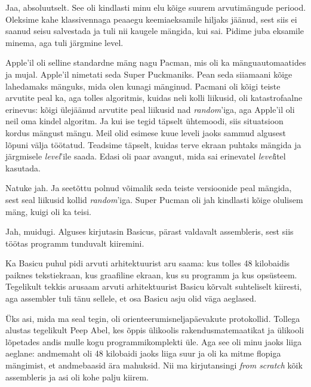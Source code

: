 
Jaa, absoluutselt. See oli kindlasti minu 
elu kõige suurem arvutimängude periood. Oleksime kahe klassivennaga peaaegu 
keemiaeksamile hiljaks jäänud, sest siis ei saanud seisu salvestada ja tuli nii kaugele mängida, kui sai. Pidime juba eksamile minema, aga tuli järgmine 
level.


Apple'il oli selline standardne mäng nagu Pacman, mis oli ka mänguautomaatides ja mujal. Apple'il nimetati seda Super Puckmaniks. Pean seda siiamaani kõige lahedamaks mänguks, mida olen kunagi 
mänginud. Pacmani oli kõigi teiste arvutite peal ka, aga tolles algoritmis, kuidas 
neli kolli liikusid, oli katastrofaalne erinevus: kõigi ülejäänud arvutite peal liikusid nad \emph{random}'iga, aga Apple'il oli neil oma kindel 
algoritm. Ja kui ise tegid täpselt ühtemoodi, siis 
situatsioon kordus mängust mängu. Meil olid esimese kuue 
leveli jaoks sammud algusest lõpuni välja töötatud. Teadsime täpselt, 
kuidas terve ekraan puhtaks mängida ja järgmisele \emph{level}'ile saada. 
Edasi oli paar avangut, mida sai erinevatel 
\emph{level}itel kasutada.


Natuke jah. Ja seetõttu polnud võimalik seda teiste versioonide peal mängida, sest 
seal liikusid kollid \emph{random}'iga. Super Pucman oli jah kindlasti 
kõige olulisem mäng, kuigi oli ka teisi.


Jah, muidugi. Alguses 
kirjutasin Basicus, pärast valdavalt 
assembleris, sest siis töötas programm 
tunduvalt kiiremini. 


Ka Basicu puhul pidi arvuti arhitektuurist aru saama: kus 
tolles 48 kilobaidis paiknes tekstiekraan, kus 
graafiline ekraan, kus su programm ja kus opsüsteem. Tegelikult tekkis arusaam
arvuti arhitektuurist Basicu kõrvalt suhteliselt kiiresti, aga 
assembler tuli tänu sellele, et osa Basicu asju olid väga aeglased. 

Üks asi, 
mida ma seal tegin, oli orienteerumisneljapäevakute protokollid. Tollega 
alustas tegelikult Peep Abel, kes õppis ülikoolis 
rakendusmatemaatikat ja ülikooli lõpetades andis mulle kogu 
programmikomplekti üle. Aga see oli minu jaoks liiga aeglane: andmemaht 
oli 48 kilobaidi jaoks liiga suur ja oli ka 
mitme flopiga mängimist, et andmebaasid ära mahuksid. Nii ma kirjutansingi \emph{from scratch} kõik assembleris ja asi oli 
kohe palju kiirem.

